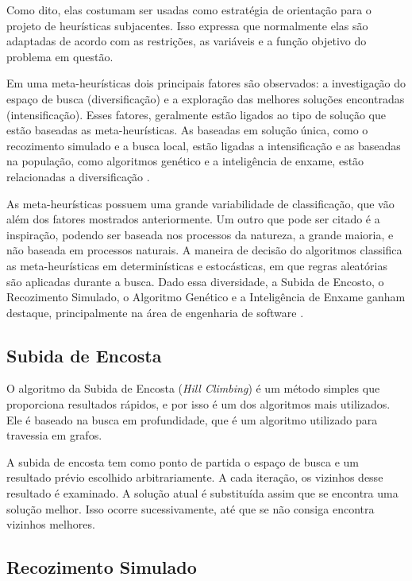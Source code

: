 Como dito, elas costumam ser usadas como estratégia de orientação para o projeto de heurísticas subjacentes. Isso expressa que normalmente elas são adaptadas de acordo com as restrições, as variáveis e a função objetivo do problema em questão. 

Em uma meta-heurísticas dois principais fatores são observados: a investigação do espaço de busca (diversificação) e a exploração das melhores soluções encontradas (intensificação). Esses fatores, geralmente estão ligados ao tipo de solução que estão baseadas as meta-heurísticas. As baseadas em solução única, como o recozimento simulado e a busca local, estão ligadas a intensificação e as baseadas na população, como algoritmos genético e a inteligência de enxame, estão relacionadas a diversificação \cite{talbi2009metaheuristics}.

As meta-heurísticas possuem uma grande variabilidade de classificação, que vão além dos fatores mostrados anteriormente. Um outro que pode ser citado é a inspiração, podendo ser baseada nos processos da natureza, a grande maioria, e não baseada em processos naturais. A maneira de decisão do algoritmos classifica as meta-heurísticas em determinísticas e estocásticas, em que regras aleatórias são aplicadas durante a busca. Dado essa diversidade, a Subida de Encosto, o Recozimento Simulado, o Algoritmo Genético e a Inteligência de Enxame ganham destaque, principalmente na área de engenharia de software \cite{khari2017extensive}.

\subsection{Subida de Encosta}

O algoritmo da Subida de Encosta (\textit{Hill Climbing}) é um método simples que proporciona resultados rápidos, e por isso é um dos algoritmos mais utilizados. Ele é baseado na busca em profundidade, que é um algoritmo utilizado para travessia em grafos. 

A subida de encosta tem como ponto de partida o espaço de busca e um resultado prévio escolhido arbitrariamente. A cada iteração, os vizinhos desse resultado é examinado. A solução atual é substituída assim que se encontra uma solução melhor. Isso ocorre sucessivamente, até que se não consiga encontra vizinhos melhores.  

\subsection{Recozimento Simulado}


